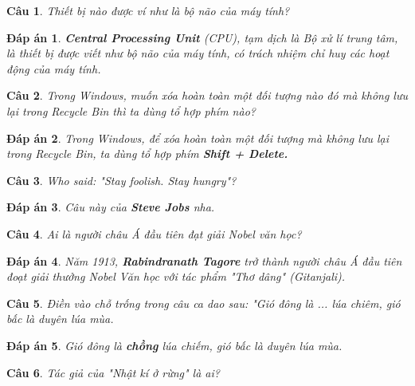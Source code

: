 \documentclass[12pt,a4paper]{article}
\newtheorem{ques}{Câu}
\theoremstyle{nonumberplain}
\newtheorem{ans}{Đáp án}
\begin{document}
\begin{ques}
Thiết bị nào được ví như là bộ não của máy tính?
\end{ques}
\begin{mybox} \begin{ans}
\textbf{Central Processing Unit} (CPU), tạm dịch là \textit{Bộ xử lí trung tâm}, là thiết bị được viết như bộ não của máy tính, có trách nhiệm chỉ huy các hoạt động của máy tính.
\end{ans} \end{mybox}
\begin{ques}
Trong Windows, muốn xóa hoàn toàn một đối tượng nào đó mà không lưu lại trong Recycle Bin thì ta dùng tổ hợp phím nào?
\end{ques}
\begin{mybox} \begin{ans}
Trong Windows, để xóa hoàn toàn một đối tượng mà không lưu lại trong Recycle Bin, ta dùng tổ hợp phím \textbf{Shift + Delete.}
\end{ans} \end{mybox}
\begin{ques}
Who said: \textit{"Stay foolish. Stay hungry"}?
\end{ques}
\begin{mybox} \begin{ans}
Câu này của \textbf{Steve Jobs} nha.
\end{ans} \end{mybox}
\begin{ques}
Ai là người châu Á đầu tiên đạt giải Nobel văn học?
\end{ques}
\begin{mybox} \begin{ans}
Năm 1913, \textbf{Rabindranath Tagore} trở thành người châu Á đầu tiên đoạt giải thưởng Nobel Văn học với tác phẩm \textit{"Thơ dâng"} (Gitanjali).
\end{ans} \end{mybox}
\begin{ques}
Điền vào chỗ trống trong câu ca dao sau: \textit{"Gió đông là ... lúa chiêm, gió bấc là duyên lúa mùa.}
\end{ques}
\begin{mybox} \begin{ans}
Gió đông là \textbf{chồng} lúa chiếm, gió bấc là duyên lúa mùa.
\end{ans} \end{mybox}
\begin{ques}
Tác giả của \textit{"Nhật kí ở rừng"} là ai?
\end{ques}
\end{document}
